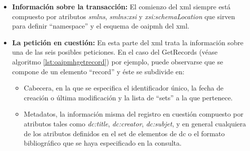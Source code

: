 \begin{itemize}
	\item \textbf{Información sobre la transacción:} El comienzo del \acrshort{xml} siempre está compuesto por atributos \textit{smlns}, \textit{smlns:xsi} y \textit{xsi:schemaLocation} que sirven para definir ``namespace'' y el esquema de \acrshort{oaipmh} del \acrshort{xml}.

	\item \textbf{La petición en cuestión:} En esta parte del \acrshort{xml} trata la información sobre una de las seis posibles peticiones. En el caso del GetRecords (véase algoritmo \ref{lst:oaipmhgetrecord}) por ejemplo, puede observarse que se compone de un elemento ``record'' y éste se subdivide en:
		\begin{itemize}
			\item Cabecera, en la que se especifica el identificador único, la fecha de creación o última modificación y la lista de ``sets'' a la que pertenece.
			\item Metadatos, la información misma del registro en cuestión compuesto por atributos tales como \textit{dc:title}, \textit{dc:creator}, \textit{dc:subjet}, y en general cualquiera de los atributos definidos en el set de elementos de \acrshort{dc}\cite{DCElements} o el formato bibliográfico que se haya especificado en la consulta.
		\end{itemize}
\end{itemize}

